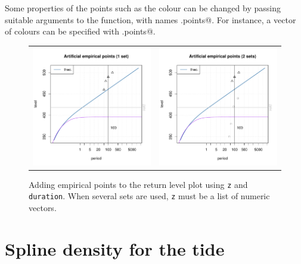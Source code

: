 \documentclass[11pt,a4paper]{report}\usepackage[]{graphicx}\usepackage[]{color}
\begin{document}
\noindent
Some properties of the points such as the colour can be changed by passing
suitable arguments to the \verb@RLSplot@ function, with names \verb@.points@.
For instance, a vector of colours can be specified with \verb@col.points@.

\begin{figure}
   \centering
   \begin{tabular}{c c} 
     \includegraphics[width=7.4cm]{Rgraphics/figempirical-1.pdf} &
     \includegraphics[width=7.4cm]{Rgraphics/figempirical1-1.pdf} 
   \end{tabular}
   \caption{\label{empirical} Adding empirical points to the return level
     plot using \texttt{z} and \texttt{duration}. When several sets are used,
     \texttt{z} must be a list of numeric vectors.}
\end{figure}

\chapter{Spline density for the tide}
\end{document}
